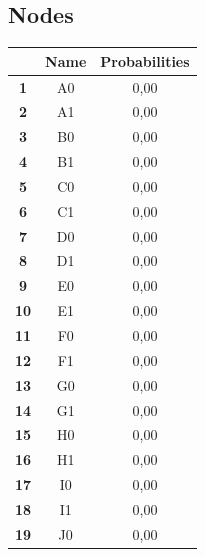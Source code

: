 \documentclass{article}
\begin{document}
\subsection{Nodes}
\begin{table}[!ht]
\centering
\begin{tabular}{c||c|c|}
\cline{2-3}
 & \cellcolor{gray90}\textbf{Name} & \cellcolor{gray90}\textbf{Probabilities}  \\
\hline\hline
\multicolumn{1}{|c||}{\cellcolor{gray90}\textbf{1}} & A0 & 0,00 \\ \hline
\multicolumn{1}{|c||}{\cellcolor{gray90}\textbf{2}} & A1 & 0,00 \\ \hline
\multicolumn{1}{|c||}{\cellcolor{gray90}\textbf{3}} & B0 & 0,00 \\ \hline
\multicolumn{1}{|c||}{\cellcolor{gray90}\textbf{4}} & B1 & 0,00 \\ \hline
\multicolumn{1}{|c||}{\cellcolor{gray90}\textbf{5}} & C0 & 0,00 \\ \hline
\multicolumn{1}{|c||}{\cellcolor{gray90}\textbf{6}} & C1 & 0,00 \\ \hline
\multicolumn{1}{|c||}{\cellcolor{gray90}\textbf{7}} & D0 & 0,00 \\ \hline
\multicolumn{1}{|c||}{\cellcolor{gray90}\textbf{8}} & D1 & 0,00 \\ \hline
\multicolumn{1}{|c||}{\cellcolor{gray90}\textbf{9}} & E0 & 0,00 \\ \hline
\multicolumn{1}{|c||}{\cellcolor{gray90}\textbf{10}} & E1 & 0,00 \\ \hline
\multicolumn{1}{|c||}{\cellcolor{gray90}\textbf{11}} & F0 & 0,00 \\ \hline
\multicolumn{1}{|c||}{\cellcolor{gray90}\textbf{12}} & F1 & 0,00 \\ \hline
\multicolumn{1}{|c||}{\cellcolor{gray90}\textbf{13}} & G0 & 0,00 \\ \hline
\multicolumn{1}{|c||}{\cellcolor{gray90}\textbf{14}} & G1 & 0,00 \\ \hline
\multicolumn{1}{|c||}{\cellcolor{gray90}\textbf{15}} & H0 & 0,00 \\ \hline
\multicolumn{1}{|c||}{\cellcolor{gray90}\textbf{16}} & H1 & 0,00 \\ \hline
\multicolumn{1}{|c||}{\cellcolor{gray90}\textbf{17}} & I0 & 0,00 \\ \hline
\multicolumn{1}{|c||}{\cellcolor{gray90}\textbf{18}} & I1 & 0,00 \\ \hline
\multicolumn{1}{|c||}{\cellcolor{gray90}\textbf{19}} & J0 & 0,00 \\ \hline

\end{tabular}
\end{table}
\end{document}
